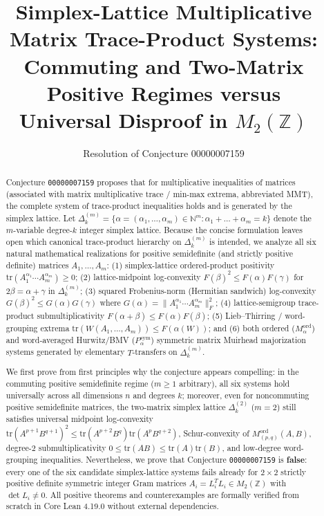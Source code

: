 \documentclass[11pt,a4paper]{article}
\title{\textbf{Simplex-Lattice Multiplicative Matrix Trace-Product Systems:\\
Commuting and Two-Matrix Positive Regimes versus\\
Universal Disproof in $M_2(\mathbb{Z})$}}
\author{Resolution of Conjecture 00000007159}
\date{}
\theoremstyle{definition}
\theoremstyle{remark}
\newcommand{\tr}{\mathrm{tr}}
\newcommand{\DeltaLat}{\Delta}
\newcommand{\Mord}{M^{\mathrm{ord}}}
\newcommand{\Psym}{P^{\mathrm{sym}}}
\begin{document}
\maketitle

\begin{abstract}
Conjecture \texttt{00000007159} proposes that for multiplicative inequalities of matrices (associated with matrix multiplicative trace / min-max extrema, abbreviated MMT), the complete system of trace-product inequalities holds and is generated by the simplex lattice. Let $\DeltaLat_k^{(m)} = \{\alpha = (\alpha_1,\dots,\alpha_m) \in \mathbb{N}^m : \alpha_1 + \dots + \alpha_m = k\}$ denote the $m$-variable degree-$k$ integer simplex lattice. Because the concise formulation leaves open which canonical trace-product hierarchy on $\DeltaLat_k^{(m)}$ is intended, we analyze all six natural mathematical realizations for positive semidefinite (and strictly positive definite) matrices $A_1,\dots,A_m$: (1) simplex-lattice ordered-product positivity $\tr(A_1^{\alpha_1}\cdots A_m^{\alpha_m}) \ge 0$; (2) lattice-midpoint log-convexity $F(\beta)^2 \le F(\alpha)F(\gamma)$ for $2\beta = \alpha + \gamma$ in $\DeltaLat_k^{(m)}$; (3) squared Frobenius-norm (Hermitian sandwich) log-convexity $G(\beta)^2 \le G(\alpha)G(\gamma)$ where $G(\alpha) = \|A_1^{\alpha_1}\cdots A_m^{\alpha_m}\|_F^2$; (4) lattice-semigroup trace-product submultiplicativity $F(\alpha + \beta) \le F(\alpha)F(\beta)$; (5) Lieb--Thirring / word-grouping extrema $\tr(W(A_1,\dots,A_m)) \le F(\alpha(W))$; and (6) both ordered ($\Mord_\alpha$) and word-averaged Hurwitz/BMV ($\Psym_\alpha$) symmetric matrix Muirhead majorization systems generated by elementary $T$-transfers on $\DeltaLat_k^{(m)}$.

We first prove from first principles why the conjecture appears compelling: in the commuting positive semidefinite regime ($m \ge 1$ arbitrary), all six systems hold universally across all dimensions $n$ and degrees $k$; moreover, even for noncommuting positive semidefinite matrices, the two-matrix simplex lattice $\DeltaLat_k^{(2)}$ ($m = 2$) still satisfies universal midpoint log-convexity $\tr(A^{p+1}B^{q+1})^2 \le \tr(A^{p+2}B^q)\tr(A^p B^{q+2})$, Schur-convexity of $\Mord_{(p,q)}(A,B)$, degree-$2$ submultiplicativity $0 \le \tr(AB) \le \tr(A)\tr(B)$, and low-degree word-grouping inequalities. Nevertheless, we prove that Conjecture \texttt{00000007159} is \textbf{false}: every one of the six candidate simplex-lattice systems fails already for $2 \times 2$ strictly positive definite symmetric integer Gram matrices $A_i = L_i^T L_i \in M_2(\mathbb{Z})$ with $\det L_i \ne 0$. All positive theorems and counterexamples are formally verified from scratch in Core Lean 4.19.0 without external dependencies.
\end{abstract}
\end{document}
